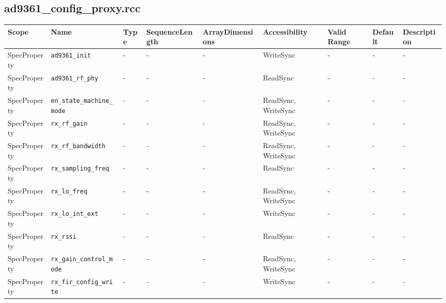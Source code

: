 \documentclass{article}
\def\comp{ad9361\_config\_proxy}
\begin{document}
\begin{landscape}
	\subsection*{\comp.rcc}
	\begin{scriptsize}
    \begin{longtable}{|p{}
                      |p{}
                      |p{}
                      |p{}
                      |p{}
                      |p{}
                      |p{}
                      |p{}
                      |p{}|}
			\hline
			\rowcolor{blue}
			Scope        & Name                 & Type & SequenceLength & ArrayDimensions & Accessibility & Valid Range        & Default & Description                                                                                                            \\
			\hline
			SpecProperty & \verb+ad9361_init+ & - & - & - & WriteSync & - & - & - \\
			\hline
			SpecProperty & \verb+ad9361_rf_phy+ & - & - & - & ReadSync & - & - & - \\
			\hline
			SpecProperty & \verb+en_state_machine_mode+ & - & - & - & ReadSync, WriteSync & - & - & - \\
			\hline
			SpecProperty & \verb+rx_rf_gain+ & - & - & - & ReadSync, WriteSync & - & - & - \\
			\hline
			SpecProperty & \verb+rx_rf_bandwidth+ & - & - & - & ReadSync, WriteSync & - & - & - \\
			\hline
			SpecProperty & \verb+rx_sampling_freq+ & - & - & - & ReadSync & - & - & - \\
			\hline
			SpecProperty & \verb+rx_lo_freq+ & - & - & - & ReadSync, WriteSync & - & - & - \\
			\hline
			SpecProperty & \verb+rx_lo_int_ext+ & - & - & - & WriteSync & - & - & - \\
			\hline
			SpecProperty & \verb+rx_rssi+ & - & - & - & ReadSync  & - & - & - \\
			\hline
			SpecProperty & \verb+rx_gain_control_mode+ & - & - & - & ReadSync, WriteSync & - & - & - \\
			\hline
			SpecProperty & \verb+rx_fir_config_write+ & - & - & - & WriteSync & - & - & - \\

\end{longtable}
\end{scriptsize}
\end{landscape}
\end{document}
